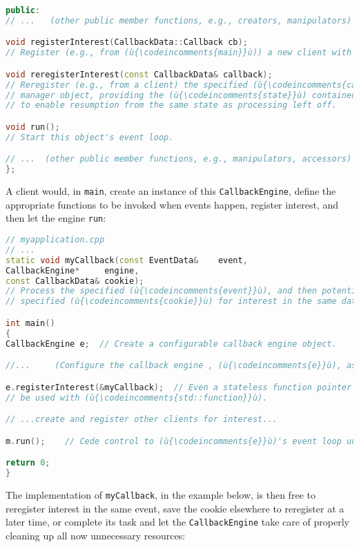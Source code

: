 \begin{lstlisting}[language=C++]
public:
// ...   (other public member functions, e.g., creators, manipulators)

void registerInterest(CallbackData::Callback cb);
// Register (e.g., from (ù{\codeincomments{main}}ù)) a new client with this manager object.

void reregisterInterest(const CallbackData& callback);
// Reregister (e.g., from a client) the specified (ù{\codeincomments{callback}}ù) with this
// manager object, providing the (ù{\codeincomments{state}}ù) contained in the (ù{\codeincomments{CallbackData}}ù)
// to enable resumption from the same state as processing left off.

void run();
// Start this object's event loop.

// ...  (other public member functions, e.g., manipulators, accessors)
};
\end{lstlisting}

\noindent A client would, in \lstinline!main!, create an instance of this
\lstinline!CallbackEngine!, define the appropriate functions to be invoked
when events happen, register interest, and then let the engine
\lstinline!run!:

\begin{lstlisting}[language=C++]
// myapplication.cpp
// ...
static void myCallback(const EventData&    event,
CallbackEngine*     engine,
const CallbackData& cookie);
// Process the specified (ù{\codeincomments{event}}ù), and then potentially reregister the
// specified (ù{\codeincomments{cookie}}ù) for interest in the same data.

int main()
{
CallbackEngine e;  // Create a configurable callback engine object.

//...     (Configure the callback engine , (ù{\codeincomments{e}}ù), as appropriate.)

e.registerInterest(&myCallback);  // Even a stateless function pointer can
// be used with (ù{\codeincomments{std::function}}ù).

// ...create and register other clients for interest...

m.run();    // Cede control to (ù{\codeincomments{e}}ù)'s event loop until complete.

return 0;
}
\end{lstlisting}

\noindent The implementation of \lstinline!myCallback!, in the example below, is then
free to reregister interest in the same event, save the cookie elsewhere
to reregister at a later time, or complete its task and let the
\lstinline!CallbackEngine! take care of properly cleaning up all now
unnecessary resources:

